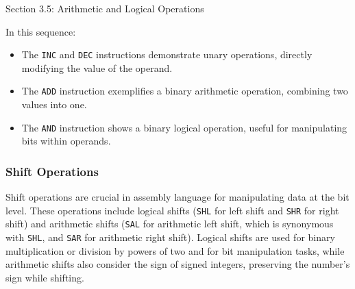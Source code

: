 \begin{notes}{Section 3.5: Arithmetic and Logical Operations}
\begin{highlight}
        In this sequence:
    
        \begin{itemize}
            \item The \texttt{INC} and \texttt{DEC} instructions demonstrate unary operations, directly modifying the value of the operand.
            \item The \texttt{ADD} instruction exemplifies a binary arithmetic operation, combining two values into one.
            \item The \texttt{AND} instruction shows a binary logical operation, useful for manipulating bits within operands.
        \end{itemize}
    \end{highlight}

    \subsubsection*{Shift Operations}

    Shift operations are crucial in assembly language for manipulating data at the bit level. These operations include logical shifts (\texttt{SHL} for left shift and \texttt{SHR} for right shift) 
    and arithmetic shifts (\texttt{SAL} for arithmetic left shift, which is synonymous with \texttt{SHL}, and \texttt{SAR} for arithmetic right shift). Logical shifts are used for binary multiplication 
    or division by powers of two and for bit manipulation tasks, while arithmetic shifts also consider the sign of signed integers, preserving the number's sign while shifting.
    

\end{notes}

